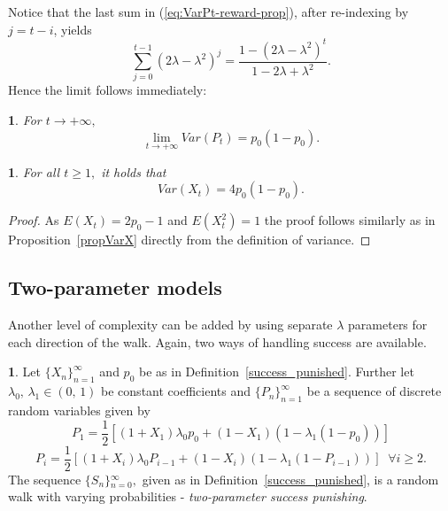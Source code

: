 \documentclass{amsart}
\theoremstyle{definition}
\newtheorem{defn}[thm]{\protect\definitionname}
\theoremstyle{plain}
\newtheorem{prop}[thm]{\protect\propositionname}
\theoremstyle{plain}
\newtheorem{cor}[thm]{\protect\corollaryname}
\theoremstyle{plain}
\numberwithin{equation}{section}
\providecommand{\corollaryname}{Corollary}
\providecommand{\definitionname}{Definition}
\providecommand{\propositionname}{Proposition}
\begin{document}
    Notice that the last sum in (\ref{eq:VarPt-reward-prop}), after re-indexing
    by $j=t-i$, yields
    \[
        \sum_{j=0}^{t-1}(2\lambda-\lambda^{2})^{j}=\frac{1-(2\lambda-\lambda^{2})^{t}}{1-2\lambda+\lambda^{2}}.
    \]
    Hence the limit follows immediately:

    \begin{cor}
        For $t\rightarrow+\infty,$ \textup{
            \[
                \lim_{t\to+\infty}Var(P_{t})=p_{0}(1-p_{0}).
            \]
        }
    \end{cor}

    \begin{prop}
        For all $t\geq1,$ it holds that
        \[
            Var(X_{t})=4p_0(1-p_0).
        \]
    \end{prop}
    \begin{proof}
        As $E(X_t)=2p_0-1$ and $E(X_t^2)=1$ the proof follows similarly as in Proposition~\ref{propVarX} directly from the definition of variance.
    \end{proof}

    \subsection{Two-parameter models}\label{subsec:two-parameter-models}

    Another level of complexity can be added by using separate $\lambda$
    parameters for each direction of the walk.
    Again, two ways of handling
    success are available.

    \begin{defn}
        \label{2lambdas}Let ${\{X_{n}\}}_{n=1}^{\infty}$ and $p_{0}$ be
        as in Definition~\ref{success_punished}.
        Further let $\lambda_{0},\,\lambda_{1}\in(0,\,1)$
        be constant coefficients and ${\{P_{n}\}}_{n=1}^{\infty}$ be a sequence
        of discrete random variables given by
        \begin{equation}
            P_{1}=\frac{1}{2}[(1+X_{1})\lambda_{0}p_{0}+(1-X_{1})(1-\lambda_{1}(1-p_{0}))]\label{eq:P!1_def-1-1}
        \end{equation}
        \begin{equation}
            P_{i}=\frac{1}{2}[(1+X_{i})\lambda_{0}P_{i-1}+(1-X_{i})(1-\lambda_{1}(1-P_{i-1}))]\;\;\forall i\geq2.\label{eq:Pi_def-1-1}
        \end{equation}
        The sequence ${\{S_{n}\}}{}_{n=0}^{\infty},$ given as in Definition~\ref{success_punished}, is a random walk with varying probabilities - \emph{two-parameter success
        punishing}.
    \end{defn}
\end{document}
